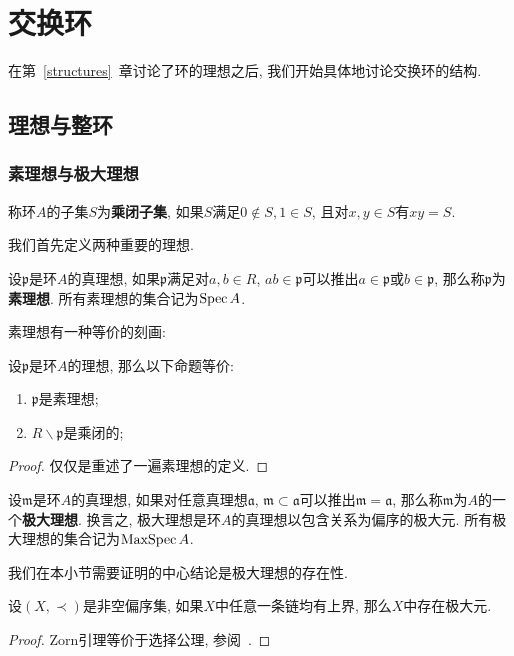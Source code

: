 \chapter{交换环}\label{ring}
在第~\ref{structures}~章讨论了环的理想之后, 我们开始具体地讨论交换环的结构.

\section{理想与整环}

\subsection{素理想与极大理想}

\begin{defn}
    称环$A$的子集$S$为\textbf{乘闭子集}, 如果$S$满足$0\notin S,1\in S$, 且对$x,y\in S$有$xy=S$.
\end{defn}

我们首先定义两种重要的理想.
\begin{defn}
    设$\mathfrak{p}$是环$A$的真理想, 如果$\mathfrak{p}$满足对$a,b\in R$, $ab\in\mathfrak{p}$可以推出$a\in\mathfrak{p}$或$b\in\mathfrak{p}$, 那么称$\mathfrak{p}$为\textbf{素理想}.
    所有素理想的集合记为$\operatorname{Spec}{A}$.
\end{defn}

素理想有一种等价的刻画:
\begin{prop}
    设$\mathfrak{p}$是环$A$的理想, 那么以下命题等价:
    \begin{enumerate}[\rm (1)]
        \item $\mathfrak{p}$是素理想;
        \item $R\backslash\mathfrak{p}$是乘闭的;
    \end{enumerate}
\end{prop}
\begin{proof}
    仅仅是重述了一遍素理想的定义.
\end{proof}

\begin{defn}
    设$\mathfrak{m}$是环$A$的真理想, 如果对任意真理想$\mathfrak{a}$, $\mathfrak{m}\subset\mathfrak{a}$可以推出$\mathfrak{m}=\mathfrak{a}$, 那么称$\mathfrak{m}$为$A$的一个\textbf{极大理想}.
    换言之, 极大理想是环$A$的真理想以包含关系为偏序的极大元.
    所有极大理想的集合记为$\operatorname{MaxSpec}{A}$.
\end{defn}

我们在本小节需要证明的中心结论是极大理想的存在性.

\begin{lem}[Zorn]
    设$(X,\prec)$是非空偏序集, 如果$X$中任意一条链均有上界, 那么$X$中存在极大元.
\end{lem}
\begin{proof}
    Zorn引理等价于选择公理, 参阅~\parencite[附录~2.2]{Lang}.
\end{proof}

